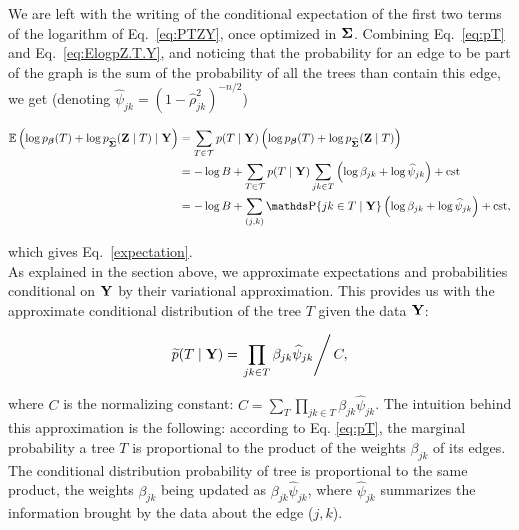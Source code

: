 We are left with the writing of the conditional expectation of the first two terms of the logarithm of Eq.~\eqref{eq:PTZY}, once optimized in ${\boldsymbol{\Sigma}}$. Combining Eq.~\eqref{eq:pT} and Eq.~\eqref{eq:ElogpZ.T.Y}, and noticing that the probability for an edge to be part of the graph is the sum of the probability of all the trees than contain this edge, we get (denoting $\widehat{\psi}_{jk} = (1- \widehat{\rho}_{jk}^2)^{-n/2}$)

\begin{align*}
    \Esp\left(\log p_\betab (T) + \log p_{\widehat{\Sigmab}}(\Zb \mid T) \mid \Yb\right)
    & = \sum_{T \in \Tcal} p(T \mid \Yb) \left(\log p_\betab(T) + \log p_{\widehat{\Sigmab}}(\Zb \mid T) \right) \\
    & = -\log B + \sum_{T \in \Tcal} p(T \mid \Yb) \sum_{jk \in T} \left(\log \beta_{jk} +\log \widehat{\psi}_{jk} \right) + \text{cst} \\
    & = -\log B + \sum_{(j, k)} \prob\{jk \in T \mid \Yb\} \left(\log \beta_{jk} + \log \widehat{\psi}_{jk} \right) + \text{cst},
\end{align*}
 
which gives Eq.~\eqref{expectation}.\\
 
As explained in the section above, we approximate expectations and probabilities conditional on ${\bf Y}$ by their variational approximation.
This provides us with the approximate conditional distribution of the tree $T$ given the data ${\bf Y}$:
 
$$
\widetilde{p}(T  \mid  {\bf Y}) = \left. \prod_{jk \in T} \beta_{jk} \widehat{\psi}_{jk}  \right/ C,
$$
 
where $C$ is the normalizing constant: $C = \sum_T \prod_{jk \in T} \beta_{jk} \widehat{\psi}_{jk}$. The intuition behind this approximation is the following: according to Eq. \eqref{eq:pT}, the marginal probability a tree $T$ is proportional to the product of the weights $\beta_{jk}$ of its edges. The conditional distribution probability of tree is proportional to the same product, the weights $\beta_{jk}$ being updated as $\beta_{jk} \widehat{\psi}_{jk}$, where $\widehat{\psi}_{jk}$ summarizes the information brought by the data about the edge ($j, k$).


